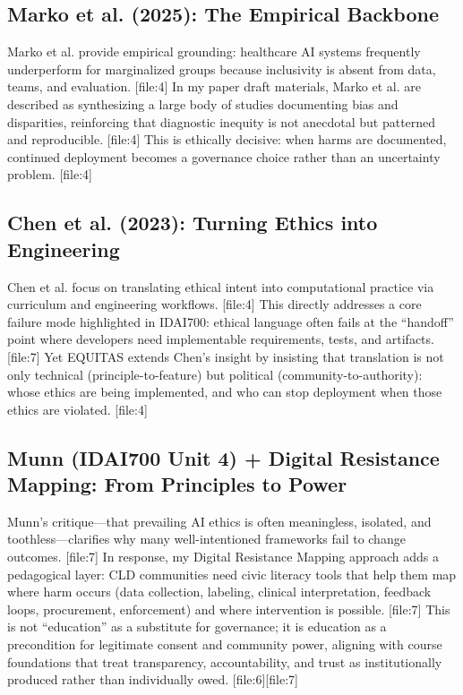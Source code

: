 \documentclass[12pt]{article}
\begin{document}
\subsection*{Marko et al. (2025): The Empirical Backbone}
Marko et al. provide empirical grounding: healthcare AI systems frequently underperform for marginalized groups because inclusivity is absent from data, teams, and evaluation. [file:4]
In my paper draft materials, Marko et al. are described as synthesizing a large body of studies documenting bias and disparities, reinforcing that diagnostic inequity is not anecdotal but patterned and reproducible. [file:4]
This is ethically decisive: when harms are documented, continued deployment becomes a governance choice rather than an uncertainty problem. [file:4]

\subsection*{Chen et al. (2023): Turning Ethics into Engineering}
Chen et al. focus on translating ethical intent into computational practice via curriculum and engineering workflows. [file:4]
This directly addresses a core failure mode highlighted in IDAI700: ethical language often fails at the ``handoff'' point where developers need implementable requirements, tests, and artifacts. [file:7]
Yet EQUITAS extends Chen's insight by insisting that translation is not only technical (principle-to-feature) but political (community-to-authority): whose ethics are being implemented, and who can stop deployment when those ethics are violated. [file:4]

\subsection*{Munn (IDAI700 Unit 4) + Digital Resistance Mapping: From Principles to Power}
Munn's critique---that prevailing AI ethics is often meaningless, isolated, and toothless---clarifies why many well-intentioned frameworks fail to change outcomes. [file:7]
In response, my Digital Resistance Mapping approach adds a pedagogical layer: CLD communities need civic literacy tools that help them map where harm occurs (data collection, labeling, clinical interpretation, feedback loops, procurement, enforcement) and where intervention is possible. [file:7]
This is not ``education'' as a substitute for governance; it is education as a precondition for legitimate consent and community power, aligning with course foundations that treat transparency, accountability, and trust as institutionally produced rather than individually owed. [file:6][file:7]
\end{document}
